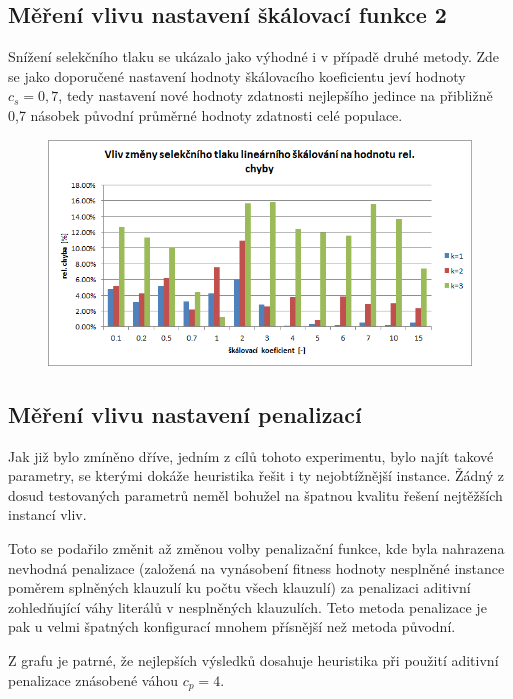 \documentclass[12pt,oneside,a4paper]{article}
\begin{document}
\subsection{Měření vlivu nastavení škálovací funkce 2}

Snížení selekčního tlaku se ukázalo jako výhodné i v případě druhé metody. Zde se jako doporučené nastavení hodnoty škálovacího koeficientu jeví hodnoty $c_s=0,7$, tedy nastavení nové hodnoty zdatnosti nejlepšího jedince na přibližně 0,7 násobek původní průměrné hodnoty zdatnosti celé populace.

\begin{figure}[ht]
\centering
\includegraphics[scale=0.9]{obr/linavgscale-err.png}
\end{figure}

\FloatBarrier
\newpage

\subsection{Měření vlivu nastavení penalizací}

Jak již bylo zmíněno dříve, jedním z cílů tohoto experimentu, bylo najít takové parametry, se kterými dokáže heuristika řešit i ty nejobtížnější instance. Žádný z dosud testovaných parametrů neměl bohužel na špatnou kvalitu řešení nejtěžších instancí vliv.

Toto se podařilo změnit až změnou volby penalizační funkce, kde byla nahrazena nevhodná penalizace (založená na vynásobení fitness hodnoty nesplněné instance poměrem splněných klauzulí ku počtu všech klauzulí) za penalizaci aditivní zohledňující váhy literálů v nesplněných klauzulích. Teto metoda penalizace je pak u velmi špatných konfigurací mnohem přísnější než metoda původní.

Z grafu je patrné, že nejlepších výsledků dosahuje heuristika při použití aditivní penalizace znásobené váhou $c_p = 4$.
\end{document}
